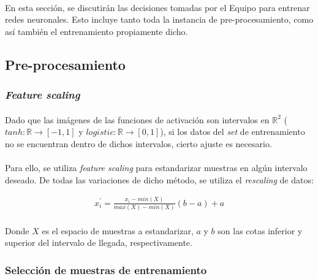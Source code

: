 \documentclass[12pt, twocolumn]{article}
\begin{document}
	\paragraph{} En esta sección, se discutirán las decisiones tomadas por el Equipo para entrenar redes neuronales. Esto incluye tanto toda la instancia de pre-procesamiento, como así también el entrenamiento propiamente dicho. 
	
	\subsection{Pre-procesamiento}
	
	\subsubsection{\textit{Feature scaling}}
	
	\paragraph{} Dado que las imágenes de las funciones de activación son intervalos en $\mathbb{R}^{2}$ ($tanh : \mathbb{R} \to \left[-1, 1\right]$ y $logistic : \mathbb{R} \to \left[0, 1\right]$), si los datos del \textit{set} de entrenamiento no se encuentran dentro de dichos intervalos, cierto ajuste es necesario.
	
	\paragraph{} Para ello, se utiliza \textit{feature scaling} para estandarizar muestras en algún intervalo deseado. De todas las variaciones de dicho método, se utiliza el \textit{rescaling} de datos:
	
	\begin{align}
		x_{i}^{'} = \frac{x_{i}-min(X)}{max(X)-min(X)}(b-a)+a
	\end{align}
	
	\paragraph{} Donde $X$ es el espacio de muestras a estandarizar, $a$ y $b$ son las cotas inferior y superior del intervalo de llegada, respectivamente. 
	
	\subsubsection{Selección de muestras de entrenamiento}
	
\end{document}
